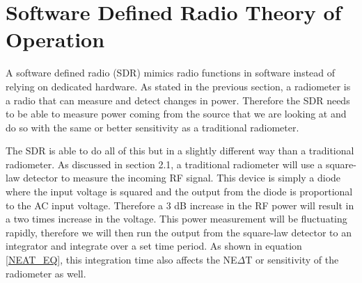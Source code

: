 


\section{Software Defined Radio Theory of Operation}

A software defined radio (SDR) mimics radio functions in software instead of relying on dedicated hardware.  As stated in the previous section, a radiometer is a radio that can measure and detect changes in power.  Therefore the SDR needs to be able to measure power coming from the source that we are looking at and do so with the same or better sensitivity as a traditional radiometer.  

The SDR is able to do all of this but in a slightly different way than a traditional radiometer.  As discussed in section 2.1, a traditional radiometer will use a square-law detector to measure the incoming RF signal.  This device is simply a diode where the input voltage is squared and the output from the diode is proportional to the AC input voltage.  Therefore a 3 dB increase in the RF power will result in a two times increase in the voltage.  This power measurement will be fluctuating rapidly, therefore we will then run the output from the square-law detector to an integrator and integrate over a set time period.  As shown in equation \ref{NEAT_EQ}, this integration time also affects the NE$\Delta$T or sensitivity of the radiometer as well.

